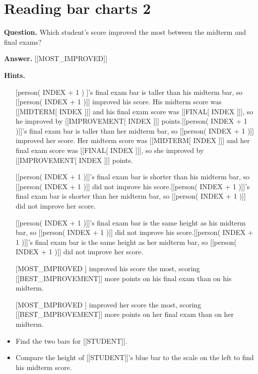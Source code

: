 \documentclass{article}
\begin{document}
\section*{Reading bar charts 2}
\textbf{Question.} Which student's score improved the most between the midterm and final exams?

\textbf{Answer.} [[MOST\_IMPROVED]]

\textbf{Hints.}
\begin{itemize}
  \item [[person( INDEX + 1 )]]'s final exam bar is taller than his
                            midterm bar, so [[person( INDEX + 1 )]] improved his score. His midterm score was
                            [[MIDTERM[ INDEX ]]] and his final exam score was [[FINAL[ INDEX ]]], so
                            he improved by [[IMPROVEMENT[ INDEX ]]] points.[[person( INDEX + 1 )]]'s final exam bar is taller than her
                            midterm bar, so [[person( INDEX + 1 )]] improved her score. Her midterm score was
                            [[MIDTERM[ INDEX ]]] and her final exam score was [[FINAL[ INDEX ]]], so
                            she improved by [[IMPROVEMENT[ INDEX ]]] points.
                            
                        
                        
                            [[person( INDEX + 1 )]]'s final exam bar is shorter than his
                            midterm bar, so [[person( INDEX + 1 )]] did not improve his score.[[person( INDEX + 1 )]]'s final exam bar is shorter than her
                            midterm bar, so [[person( INDEX + 1 )]] did not improve her score.
                            
                        
                        
                            [[person( INDEX + 1 )]]'s final exam bar is the same height as his
                            midterm bar, so [[person( INDEX + 1 )]] did not improve his score.[[person( INDEX + 1 )]]'s final exam bar is the same height as her
                            midterm bar, so [[person( INDEX + 1 )]] did not improve her score.
  \item [[MOST\_IMPROVED]] improved his score the most, scoring [[BEST\_IMPROVEMENT]] more points
                        on his final exam than on his midterm.
  \item [[MOST\_IMPROVED]] improved her score the most, scoring [[BEST\_IMPROVEMENT]] more points
                        on her final exam than on her midterm.
  \item Find the two bars for [[STUDENT]].
  \item Compare the height of [[STUDENT]]'s blue bar to the scale on the left to find his midterm score.
                            

\end{itemize}
\end{document}
